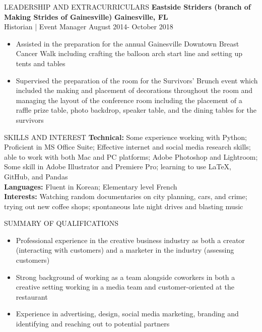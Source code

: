 \documentclass{resume}
\begin{document}
\begin{rSection}{LEADERSHIP AND EXTRACURRICULARS}
{\bf Eastside Striders (branch of Making Strides of Gainesville) } \hfill {\bf Gainesville, FL}
\\ {Historian | Event Manager	} \hfill {August 2014- October 2018	}
\begin{itemize}
  \item Assisted in the preparation for the annual Gainesville Downtown Breast Cancer Walk including crafting the balloon arch start line and setting up tents and tables
  \item Supervised the preparation of the room for the Survivors’ Brunch event which included the making and placement of decorations throughout the room and managing the layout of the conference room including the placement of a raffle prize table, photo backdrop, speaker table, and the dining tables for the survivors 
\end{itemize}

\end{rSection}


\begin{rSection}{SKILLS AND INTEREST}
\small
{\bf Technical:} {Some experience working with Python; Proficient in MS Office Suite; Effective internet and social media research skills; able to work with both Mac and PC platforms; Adobe Photoshop and Lightroom; Some skill in Adobe Illustrator and Premiere Pro; learning to use LaTeX, GitHub, and Pandas} \\
{\bf Languages:} { Fluent in Korean; Elementary level French }\\
{\bf Interests:} {Watching random documentaries on city planning, cars, and crime; trying out new coffee shops; spontaneous late night drives and blasting music}\\

\end{rSection}


\begin{rSection}{SUMMARY OF QUALIFICATIONS}
\small
\begin{itemize}
    \item Professional experience in the creative business industry as both a creator (interacting with customers) and a marketer in the industry (assessing customers)
    \item Strong background of working as a team alongside coworkers in both a creative setting working in a media team and customer-oriented at the restaurant
    \item Experience in advertising, design, social media marketing, branding and identifying and reaching out to potential partners 
\end{itemize}

\end{rSection}
\end{document}
